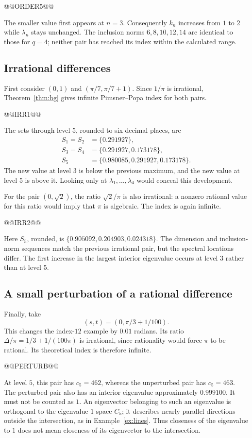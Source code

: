 \documentclass[11pt]{article}
\theoremstyle{definition}
\theoremstyle{remark}
\begin{document}
@@ORDER5@@

The smaller value first appears at \(n=3\). Consequently \(k_n\)
increases from \(1\) to \(2\) while \(\lambda_n\) stays unchanged.
The inclusion norms \(6,8,10,12,14\) are identical to those for \(q=4\);
neither pair has reached its index within the calculated range.

\subsection{Irrational differences}
First consider \((0,1)\) and \((\pi/7,\pi/7+1)\).
Since \(1/\pi\) is irrational, Theorem~\ref{thm:bg} gives infinite
Pimsner--Popa index for both pairs.

@@IRR1@@

The sets through level \(5\), rounded to six decimal places, are
\[
 \begin{aligned}
 S_1=S_2&=\{0.291927\},\\
 S_3=S_4&=\{0.291927,0.173178\},\\
 S_5&=\{0.980085,0.291927,0.173178\}.
 \end{aligned}
\]
The new value at level \(3\) is below the previous maximum, and
the new value at level \(5\) is above it. Looking only at
\(\lambda_1,\ldots,\lambda_4\) would conceal this development.

For the pair \((0,\sqrt2)\), the ratio \(\sqrt2/\pi\) is also
irrational: a nonzero rational value for this ratio would imply
that \(\pi\) is algebraic. The index is again infinite.

@@IRR2@@

Here \(S_5\), rounded, is
\(\{0.905092,0.204903,0.024318\}\).
The dimension and inclusion-norm sequences match the previous
irrational pair, but the spectral locations differ. The first
increase in the largest interior eigenvalue occurs at level \(3\)
rather than at level \(5\).

\subsection{A small perturbation of a rational difference}
Finally, take
\[
 (s,t)=(0,\pi/3+1/100).
\]
This changes the index-\(12\) example by \(0.01\) radians.
Its ratio \(\Delta/\pi=1/3+1/(100\pi)\) is irrational, since
rationality would force \(\pi\) to be rational. Its theoretical
index is therefore infinite.

@@PERTURB@@

At level \(5\), this pair has \(c_5=462\), whereas the unperturbed
pair has \(c_5=463\). The perturbed pair also has an interior
eigenvalue approximately \(0.999100\). It must not be counted as \(1\).
An eigenvector belonging to such an eigenvalue is orthogonal to the
eigenvalue-\(1\) space \(C_5\); it describes nearly parallel
directions outside the intersection, as in Example~\ref{ex:lines}.
Thus closeness of the eigenvalue to \(1\) does not mean closeness
of its eigenvector to the intersection.
\end{document}
